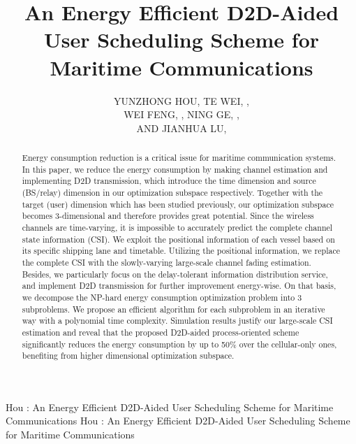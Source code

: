 \documentclass{ieeeaccess}
\begin{document}

\title{An Energy Efficient D2D-Aided User Scheduling Scheme for Maritime Communications}
\author{\uppercase{Yunzhong Hou}, 
\uppercase{Te Wei}, ,\\
\uppercase{Wei Feng}, , 
\uppercase{Ning Ge}, ,
\\ \uppercase{and Jianhua Lu}, }

\address[1]{Tsinghua National Laboratory for Information Science and Technology, Tsinghua University, Beijing 100084, P. R. China}


\markboth
{Hou \headeretal: An Energy Efficient D2D-Aided User Scheduling Scheme for Maritime Communications}
{Hou \headeretal: An Energy Efficient D2D-Aided User Scheduling Scheme for Maritime Communications}


\begin{abstract}

Energy consumption reduction is a critical issue for maritime communication systems. 
In this paper, we reduce the energy consumption by making channel estimation and implementing D2D transmission, which introduce the time dimension and source (BS/relay) dimension in our optimization subspace respectively. Together with the target (user) dimension which has been studied previously, our optimization subspace becomes 3-dimensional and therefore provides great potential. 
Since the wireless channels are time-varying, it is impossible to accurately predict the complete channel state information (CSI). We exploit the positional information of each vessel based on its specific shipping lane and timetable. Utilizing the positional information, we replace the complete CSI with the slowly-varying large-scale channel fading estimation. Besides, we particularly focus on the delay-tolerant information distribution service, and implement D2D transmission for further improvement energy-wise. 
On that basis, we decompose the NP-hard energy consumption optimization problem into 3 subproblems. We propose an efficient algorithm for each subproblem in an iterative way with a polynomial time complexity. 
Simulation results justify our large-scale CSI estimation and reveal that the proposed D2D-aided process-oriented scheme significantly reduces the energy consumption by up to 50\% over the cellular-only ones, benefiting from higher dimensional optimization subspace.

\end{abstract}
\end{document}
